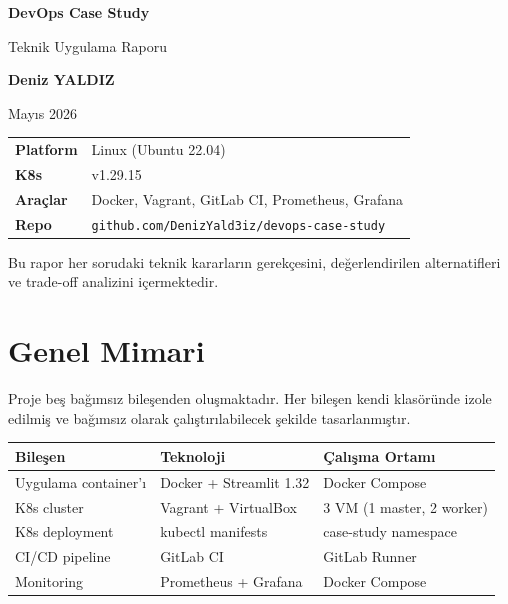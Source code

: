 \documentclass[12pt,a4paper]{article}
\begin{document}
\begin{titlepage}
  \centering
  \vspace*{2cm}
  {\Huge\bfseries DevOps Case Study\par}
  \vspace{0.5cm}
  {\Large Teknik Uygulama Raporu\par}
  \vspace{2cm}
  {\large\bfseries Deniz YALDIZ\par}
  \vspace{0.3cm}
  {\normalsize Mayıs 2026\par}
  \vspace{3cm}
  \begin{tabular}{ll}
    \textbf{Platform}   & Linux (Ubuntu 22.04) \\
    \textbf{K8s}        & v1.29.15 \\
    \textbf{Araçlar}    & Docker, Vagrant, GitLab CI, Prometheus, Grafana \\
    \textbf{Repo}       & \texttt{github.com/DenizYald3iz/devops-case-study} \\
  \end{tabular}
  \vfill
  {\small Bu rapor her sorudaki teknik kararların gerekçesini,
  değerlendirilen alternatifleri ve trade-off analizini içermektedir.}
\end{titlepage}

\tableofcontents
\newpage

\section{Genel Mimari}

Proje beş bağımsız bileşenden oluşmaktadır. Her bileşen kendi
klasöründe izole edilmiş ve bağımsız olarak çalıştırılabilecek
şekilde tasarlanmıştır.

\begin{center}
\begin{tabular}{lll}
\toprule
\textbf{Bileşen} & \textbf{Teknoloji} & \textbf{Çalışma Ortamı} \\
\midrule
Uygulama container'ı & Docker + Streamlit 1.32 & Docker Compose \\
K8s cluster           & Vagrant + VirtualBox     & 3 VM (1 master, 2 worker) \\
K8s deployment        & kubectl manifests        & case-study namespace \\
CI/CD pipeline        & GitLab CI                & GitLab Runner \\
Monitoring            & Prometheus + Grafana     & Docker Compose \\
\bottomrule
\end{tabular}
\end{center}
\end{document}
